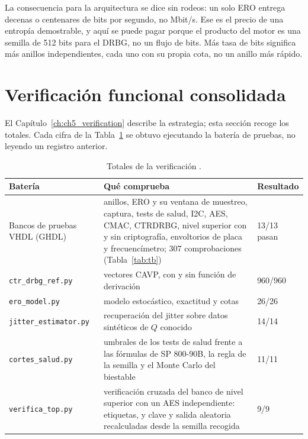 La consecuencia para la arquitectura se dice sin rodeos: un solo \ac{ERO}
entrega decenas o centenares de bits por segundo, no Mbit/s. Ese es el
precio de una entropía demostrable, y aquí se puede pagar porque el
producto del motor es una semilla de 512 bits para el \ac{DRBG}, no un
flujo de bits. Más tasa de bits significa más anillos independientes,
cada uno con su propia cota, no un anillo más rápido.

\section{Verificación funcional consolidada}
\label{sec:verif_results}

El Capítulo~\ref{ch:ch5_verification} describe la estrategia; esta
sección recoge los totales. Cada cifra de la Tabla~\ref{tab:verif} se
obtuvo ejecutando la batería de pruebas, no leyendo un registro anterior.

\begin{table}[htbp]
\centering
\caption{Totales de la verificación \simu{}.}
\label{tab:verif}
\small
\begin{tabular}{@{}lp{7.0cm}l@{}}
\toprule
Batería & Qué comprueba & Resultado \\
\midrule
Bancos de pruebas VHDL (GHDL) & anillos, \ac{ERO} y su ventana de
  muestreo, captura, tests de salud, \ac{I2C}, \ac{AES}, \ac{CMAC},
  \ac{CTRDRBG}, nivel superior con y sin criptografía, envoltorios de
  placa y frecuencímetro; 307 comprobaciones (Tabla~\ref{tab:tb}) & 13/13 pasan \\
\texttt{ctr\_drbg\_ref.py} & vectores \ac{CAVP}, con y sin
  función de derivación & 960/960 \\
\texttt{ero\_model.py} & modelo estocástico, exactitud y cotas & 26/26 \\
\texttt{jitter\_estimator.py} & recuperación del jitter sobre datos
  sintéticos de $Q$ conocido & 14/14 \\
\texttt{cortes\_salud.py} & umbrales de los tests de salud frente a las
  fórmulas de SP 800-90B, la regla de la semilla y el Monte Carlo del
  biestable & 11/11 \\
\texttt{verifica\_top.py} & verificación cruzada del banco de nivel
  superior con un \ac{AES} independiente: etiquetas, y clave y salida
  aleatoria recalculadas desde la semilla recogida & 9/9 \\
\bottomrule
\end{tabular}
\end{table}

